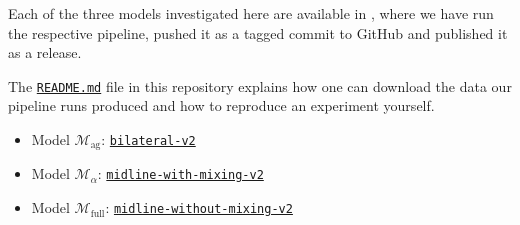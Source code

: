 \begin{tcolorbox}[title=\faIcon{recycle} Reproducibility, parbox=false]
    Each of the three models investigated here are available in , where we have run the respective pipeline, pushed it as a tagged commit to GitHub and published it as a release.

    The \href{https://github.com/rmnldwg/lynference#readme}{ \texttt{README.md}} file in this repository explains how one can download the data our pipeline runs produced and how to reproduce an experiment yourself.

    \begin{itemize}
        \item Model $\mathcal{M}_\text{ag}$: \href{https://github.com/rmnldwg/lynference/releases/tag/bilateral-v2}{ \texttt{bilateral-v2}}
        \item Model $\mathcal{M}_\alpha$: \href{https://github.com/rmnldwg/lynference/releases/tag/midline-with-mixing-v2}{ \texttt{midline-with-mixing-v2}}
        \item Model $\mathcal{M}_\text{full}$: \href{https://github.com/rmnldwg/lynference/releases/tag/midline-without-mixing-v2}{ \texttt{midline-without-mixing-v2}}
    \end{itemize}
\end{tcolorbox}
